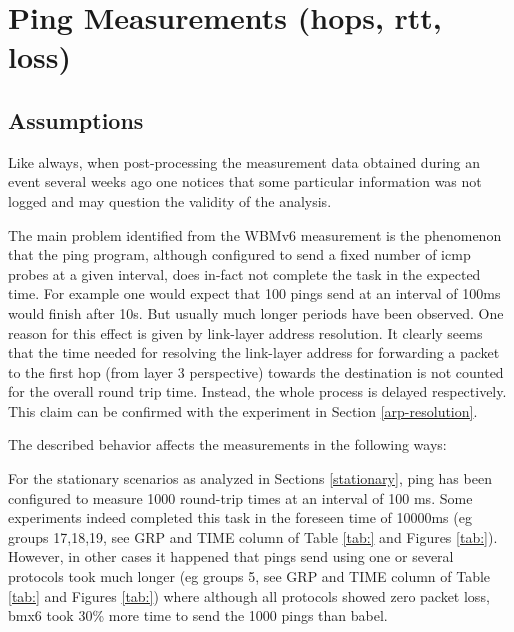 \documentclass[a4paper,12pt,twoside]{article}
\begin{document}
\clearpage

\section{Ping Measurements (hops, rtt, loss)}
\label{sec:ping-measurements}

\subsection{Assumptions}

Like always, when post-processing the measurement data obtained during
an event several weeks ago one notices that some particular
information was not logged and may question the validity of the
analysis. 

The main problem identified from the WBMv6 measurement is the
phenomenon that the ping program, although configured to send a fixed
number of icmp probes at a given interval, does in-fact not complete
the task in the expected time.  For example one would expect that 100
pings send at an interval of 100ms would finish after 10s. But usually
much longer periods have been observed. One reason for this effect is
given by link-layer address resolution. It clearly seems that the time
needed for resolving the link-layer address for forwarding a packet to
the first hop (from layer 3 perspective) towards the destination is
not counted for the overall round trip time. Instead, the whole
process is delayed respectively. This claim can be confirmed with the
experiment in Section \ref{arp-resolution}.


The described behavior affects the measurements in the following ways:

For the stationary scenarios as analyzed in Sections \ref{stationary},
ping has been configured to measure 1000 round-trip times at an
interval of 100 ms. Some experiments indeed completed this task in the
foreseen time of 10000ms (eg groups 17,18,19, see GRP and TIME column
of Table \ref{tab:} and Figures \ref{tab:}).  However, in other cases
it happened that pings send using one or several protocols took much
longer (eg groups 5, see GRP and TIME column of Table \ref{tab:} and
Figures \ref{tab:}) where although all protocols showed zero packet
loss, bmx6 took 30\% more time to send the 1000 pings than babel. 
\end{document}
